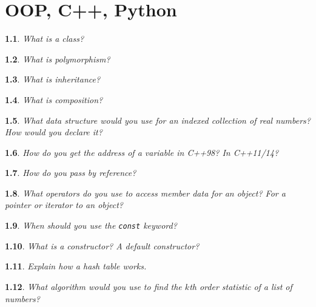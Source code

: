 \documentclass{report}
\newtheorem{problem}{}
\numberwithin{problem}{chapter} %
\begin{document}
\chapter{OOP, C++, Python}

\begin{problem}
What is a class?
\end{problem}

\begin{problem}
What is polymorphism?
\end{problem}

\begin{problem}
What is inheritance? 
\end{problem}

\begin{problem}
What is composition?
\end{problem}

\begin{problem}
What data structure would you use for an indexed collection of real numbers? How would you declare it?
\end{problem}

\begin{problem}
How do you get the address of a variable in C++98? In C++11/14?
\end{problem}

\begin{problem}
How do you pass by reference?
\end{problem}

\begin{problem}
What operators do you use to access member data for an object? For a pointer or iterator to an object?
\end{problem}

\begin{problem}
When should you use the \verb|const| keyword?
\end{problem}

\begin{problem}
What is a constructor? A default constructor? 
\end{problem}

\begin{problem}
Explain how a hash table works.
\end{problem}

\begin{problem}
What algorithm would you use to find the $k$th order statistic of a list of numbers? 
\end{problem}
\end{document}
